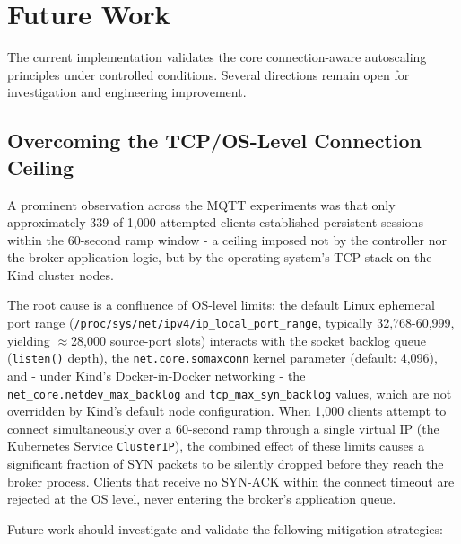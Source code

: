 \documentclass[twocolumn]{svjour3}
\begin{document}
\section{Future Work}
\label{sec:future_work}

The current implementation validates the core connection-aware autoscaling principles under controlled conditions. Several directions remain open for investigation and engineering improvement.

\subsection{Overcoming the TCP/OS-Level Connection Ceiling}

A prominent observation across the MQTT experiments was that only approximately 339 of 1,000 attempted clients established persistent sessions within the 60-second ramp window - a ceiling imposed not by the controller nor the broker application logic, but by the operating system's TCP stack on the Kind cluster nodes.

The root cause is a confluence of OS-level limits: the default Linux ephemeral port range (\texttt{/proc/sys/net/ipv4/ip\_local\_port\_range}, typically 32,768-60,999, yielding $\approx$28,000 source-port slots) interacts with the socket backlog queue (\texttt{listen()} depth), the \texttt{net.core.somaxconn} kernel parameter (default: 4,096), and - under Kind's Docker-in-Docker networking - the \texttt{net\_core.netdev\_max\_backlog} and \texttt{tcp\_max\_syn\_backlog} values, which are not overridden by Kind's default node configuration. When 1,000 clients attempt to connect simultaneously over a 60-second ramp through a single virtual IP (the Kubernetes Service \texttt{ClusterIP}), the combined effect of these limits causes a significant fraction of SYN packets to be silently dropped before they reach the broker process. Clients that receive no SYN-ACK within the connect timeout are rejected at the OS level, never entering the broker's application queue.

Future work should investigate and validate the following mitigation strategies:
\end{document}
